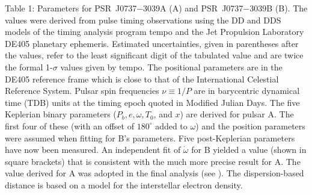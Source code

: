 \documentclass[12pt,psfig]{article}
\begin{document}
\noindent Table 1: Parameters for PSR~J0737$-$3039A (A) and PSR~J0737$-$3039B (B).
The values were derived from pulse timing observations using the DD
\cite{dd86} and DDS \cite{ksm+06a} models of the timing
analysis program {\sc tempo} and the Jet Propulsion Laboratory
DE405 planetary ephemeris\cite{sta98c}. Estimated uncertainties, given in
parentheses after the values, refer to the least significant digit of the
tabulated value and are twice the formal 1-$\sigma$ values given by {\sc
  tempo}. The positional parameters are in the DE405 reference frame which is
close to that of the International Celestial Reference System. Pulsar spin
frequencies $\nu \equiv 1/P$ are in barycentric dynamical time (TDB) units at
the timing epoch quoted in Modified Julian Days.  The five Keplerian binary
parameters ($P_b, e, \omega, T_0$, and $x$) are derived for pulsar A. The
first four of these (with an offset of $180^\circ$ added to $\omega$) and the
position parameters were assumed when fitting for B's parameters.  Five
post-Keplerian parameters have now been measured.  An independent fit of
$\dot\omega$ for B yielded a value (shown in square brackets) that is
consistent with the much more precise result for A.  The value derived for A
was adopted in the final analysis (see \cite{som}).  The
dispersion-based distance is based on a model for the interstellar electron
density\cite{cl02}.
\end{document}
